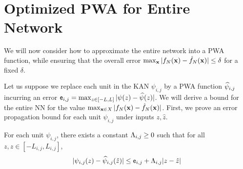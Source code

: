 \section{Optimized PWA for Entire Network }\label{sec:optimal-pwa-for-entire-kan}

We will now consider how to approximate the entire network into a PWA function, while ensuring that the overall error $\max_{\mathbf{x}} | f_N(\mathbf{x}) - \hat{f}_N(\mathbf{x}) | \leq \delta$ for a fixed $\delta$. 

Let us suppose we replace each unit in the KAN $\psi_{i,j}$ by a PWA function $\widehat{\psi}_{i,j}$ incurring an error $\mathsf{e}_{i,j} = \max_{z \in [-L, L]} | \psi(z) - \widehat{\psi}(z)|$. We will derive a bound for the entire NN for the value $\max_{\mathbf{x} \in X} | f_N(\mathbf{x}) - \hat{f}_N(\mathbf{x})|$.
First, we prove an error propagation bound for each unit $\psi_{i,j}$ under inputs $z, \hat{z}$.
\begin{lemma}\label{Lemma:lipschitz-unit}
    For each unit $\psi_{i,j}$, there exists a constant $ \Lambda_{i,j} \geq 0$ such that for all $z, \hat{z} \in [-L_{i,j}, L_{i,j}]$,
    \begin{equation*}
        |\psi_{i,j}(z) - \widehat{\psi}_{i,j}(\hat{z}) |  \leq \mathsf{e}_{i,j} + \Lambda_{i,j} | z - \hat{z}|
    \end{equation*}
\end{lemma}
